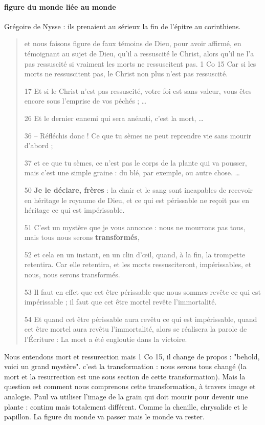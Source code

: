 
\paragraph{figure du monde liée au monde} Grégoire de Nysse : ils prenaient au sérieux la fin de l'épitre au corinthiens. 
\begin{quote}
     et nous faisons figure de faux témoins de Dieu, pour avoir affirmé, en témoignant au sujet de Dieu, qu’il a ressuscité le Christ, alors qu’il ne l’a pas ressuscité si vraiment les morts ne ressuscitent pas. 1 Co 15
     Car si les morts ne ressuscitent pas, le Christ non plus n’est pas ressuscité.

17 Et si le Christ n’est pas ressuscité, votre foi est sans valeur, vous êtes encore sous l’emprise de vos péchés ;
 \ldots

26 Et le dernier ennemi qui sera anéanti, c’est la mort,
\ldots

36 – Réfléchis donc ! Ce que tu sèmes ne peut reprendre vie sans mourir d’abord ;

37 et ce que tu sèmes, ce n’est pas le corps de la plante qui va pousser, mais c’est une simple graine : du blé, par exemple, ou autre chose.
\ldots
 

50\textbf{ Je le déclare, frères} : la chair et le sang sont incapables de recevoir en héritage le royaume de Dieu, et ce qui est périssable ne reçoit pas en héritage ce qui est impérissable.

51 C’est un mystère que je vous annonce : nous ne mourrons pas tous, mais tous nous serons \textbf{transformés},

52 et cela en un instant, en un clin d’œil, quand, à la fin, la trompette retentira. Car elle retentira, et les morts ressusciteront, impérissables, et nous, nous serons transformés.

53 Il faut en effet que cet être périssable que nous sommes revête ce qui est impérissable ; il faut que cet être mortel revête l’immortalité.

54 Et quand cet être périssable aura revêtu ce qui est impérissable, quand cet être mortel aura revêtu l’immortalité, alors se réalisera la parole de l’Écriture : La mort a été engloutie dans la victoire.
     
\end{quote}
Nous entendons mort et ressurection
mais 1 Co 15, il change de propos : "behold, voici un grand mystère". c'est la transformation  : nous serons tous changé (la mort et la resurrection est une sous section de cette transformation).
Mais la question est comment nous comprenons cette transformation, à travers image et analogie. Paul va utiliser l'image de la grain qui doit mourir pour devenir une plante : continu mais totalement différent.
Comme la chenille, chrysalide et le papillon. 
La figure du monde va passer mais le monde va rester.

